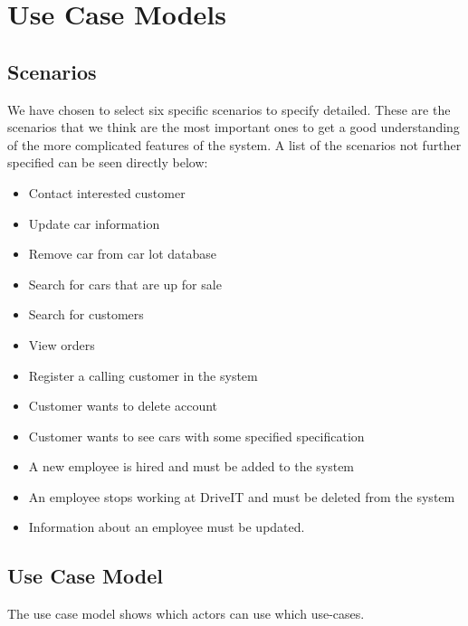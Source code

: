 \section{Use Case Models}

\subsection{Scenarios}
We have chosen to select six specific scenarios to specify detailed. These are the scenarios that we think are the most important ones to get a good understanding of the more complicated features of the system. A list of the scenarios not further specified can be seen directly below:

\begin{itemize}
    \item Contact interested customer
    \item Update car information
    \item Remove car from car lot database
    \item Search for cars that are up for sale
    \item Search for customers
    \item View orders
    \item Register a calling customer in the system
    \item Customer wants to delete account
    \item Customer wants to see cars with some specified specification
    \item A new employee is hired and must be added to the system
    \item An employee stops working at DriveIT and must be deleted from the system
    \item Information about an employee must be updated.
\end{itemize}













\subsection{Use Case Model}
The use case model shows which actors can use which use-cases.\\

